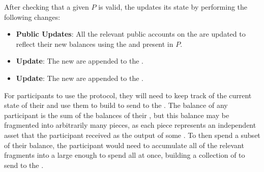 \begin{definition}
    After checking that a given \TransferPost{} $P$ is valid, the \Ledger{} updates its state by performing the following changes:
    \begin{itemize}
        \item \textbf{Public Updates}: All the relevant public accounts on the \PublicLedger{} are updated to reflect their new balances using the  and  present in $P$.
        \item \textbf{\UTXOSet{} Update}: The new  are appended to the \UTXOSet{}.
        \item \textbf{\NullifierSet{} Update}: The new  are appended to the \NullifierSet{}.
    \end{itemize}
\end{definition}


For \MantaPay{} participants to use the \Transfer{} protocol, they will need to keep track of the current state of their  and use them to build  to send to the \Ledger{}. The balance of any participant is the sum of the balances of their , but this balance may be fragmented into arbitrarily many pieces, as each piece represents an independent asset that the participant received as the output of some \Transfer{}. To then spend a subset of their balance, the participant would need to accumulate all of the relevant fragments into a large enough \zkAsset{} to spend all at once, building a collection of  to send to the \Ledger{}.

